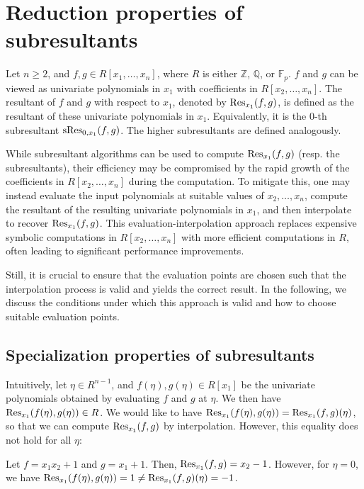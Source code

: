 \section{Reduction properties of subresultants}

Let $n\geq 2$, and $f,g\in R[x_1,\dots,x_n]$, where $R$ is either $\mathbb{Z}$, $\mathbb{Q}$, or $\mathbb{F}_{p}$. $f$ and $g$ can be viewed as univariate polynomials in $x_1$ with coefficients in $R[x_2,\dots,x_n]$.
The resultant of $f$ and $g$ with respect to $x_1$, denoted by $\operatorname{Res}_{x_1}(f,g)$, is defined as the resultant of these univariate polynomials in $x_1$. Equivalently, it is the $0$-th subresultant $\operatorname{sRes}_{0,x_1}(f,g)$. The higher subresultants are defined analogously.

While subresultant algorithms can be used to compute $\operatorname{Res}_{x_1}(f,g)$ (resp. the subresultants), their efficiency may be compromised by the rapid growth of the coefficients in $R[x_2,\dots,x_n]$ during the computation. To mitigate this, one may instead evaluate the input polynomials at suitable values of $x_2,\dots,x_n$, compute the resultant of the resulting univariate polynomials in $x_1$, and then interpolate to recover $\operatorname{Res}_{x_1}(f,g)$. This evaluation-interpolation approach replaces expensive symbolic computations in $R[x_2,\dots,x_n]$ with more efficient computations in $R$, often leading to significant performance improvements.

Still, it is crucial to ensure that the evaluation points are chosen such that the interpolation process is valid and yields the correct result. In the following, we discuss the conditions under which this approach is valid and how to choose suitable evaluation points.

\subsection{Specialization properties of subresultants}

Intuitively, let $\eta\in R^{n-1}$, and $f(\eta),g(\eta)\in R[x_1]$ be the univariate polynomials obtained by evaluating $f$ and $g$ at $\eta$. We then have $\operatorname{Res}_{x_1}(f(\eta),g(\eta))\in R$. We would like to have $\operatorname{Res}_{x_1}(f(\eta),g(\eta))=\operatorname{Res}_{x_1}(f,g)(\eta)$, so that we can compute $\operatorname{Res}_{x_1}(f,g)$ by interpolation. However, this equality does not hold for all $\eta$:

\begin{example}
    Let $f=x_1x_2+1$ and $g=x_1+1$. Then, $\operatorname{Res}_{x_1}(f,g)=x_2-1$. However, for $\eta=0$, we have $\operatorname{Res}_{x_1}(f(\eta),g(\eta))=1\neq\operatorname{Res}_{x_1}(f,g)(\eta)=-1$.
\end{example}

